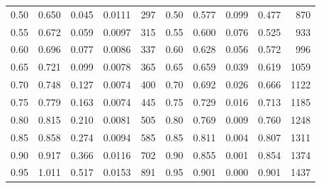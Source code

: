 \begin{table}[htbp]
\begin{tabular}{rrrrrrrrrr}
0.50 & 0.650 & 0.045 & 0.0111 & 297 & 0.50 & 0.577 & 0.099 & 0.477 & 870 \\
0.55 & 0.672 & 0.059 & 0.0097 & 315 & 0.55 & 0.600 & 0.076 & 0.525 & 933 \\
0.60 & 0.696 & 0.077 & 0.0086 & 337 & 0.60 & 0.628 & 0.056 & 0.572 & 996 \\
0.65 & 0.721 & 0.099 & 0.0078 & 365 & 0.65 & 0.659 & 0.039 & 0.619 & 1059 \\
0.70 & 0.748 & 0.127 & 0.0074 & 400 & 0.70 & 0.692 & 0.026 & 0.666 & 1122 \\
0.75 & 0.779 & 0.163 & 0.0074 & 445 & 0.75 & 0.729 & 0.016 & 0.713 & 1185 \\
0.80 & 0.815 & 0.210 & 0.0081 & 505 & 0.80 & 0.769 & 0.009 & 0.760 & 1248 \\
0.85 & 0.858 & 0.274 & 0.0094 & 585 & 0.85 & 0.811 & 0.004 & 0.807 & 1311 \\
0.90 & 0.917 & 0.366 & 0.0116 & 702 & 0.90 & 0.855 & 0.001 & 0.854 & 1374 \\
0.95 & 1.011 & 0.517 & 0.0153 & 891 & 0.95 & 0.901 & 0.000 & 0.901 & 1437 \\
\hline
\end{tabular}
\end{table}
